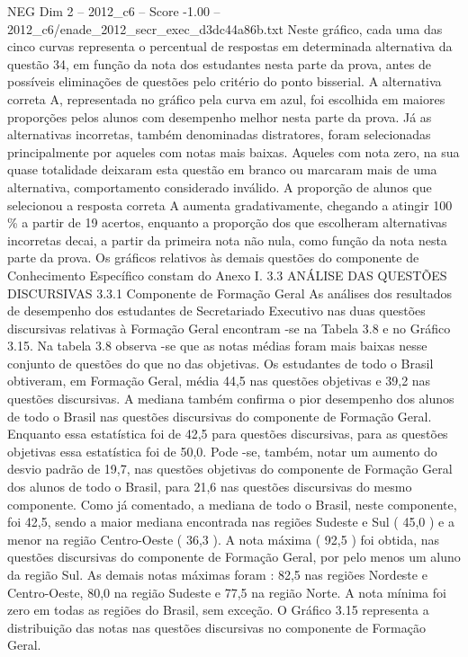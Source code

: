 \begin{textsample}{NEG Dim 2 – 2012\_c6 – Score -1.00 – 2012\_c6/enade\_2012\_secr\_exec\_d3dc44a86b.txt}
Neste gráfico, cada uma das cinco curvas representa o percentual de respostas em determinada alternativa da questão 34, em função da nota dos estudantes nesta parte da prova, antes de possíveis eliminações de questões pelo critério do ponto bisserial.
A alternativa correta A, representada no gráfico pela curva em azul, foi escolhida em maiores proporções pelos alunos com desempenho melhor nesta parte da prova.
Já as alternativas incorretas, também denominadas distratores, foram selecionadas principalmente por aqueles com notas mais baixas.
Aqueles com nota zero, na sua quase totalidade deixaram esta questão em branco ou marcaram mais de uma alternativa, comportamento considerado inválido.
A proporção de alunos que selecionou a resposta correta A aumenta gradativamente, chegando a atingir 100 \% a partir de 19 acertos, enquanto a proporção dos que escolheram alternativas incorretas decai, a partir da primeira nota não nula, como função da nota nesta parte da prova.
Os gráficos relativos às demais questões do componente de Conhecimento Específico constam do Anexo I. 3.3 ANÁLISE DAS QUESTÕES DISCURSIVAS 3.3.1 Componente de Formação Geral As análises dos resultados de desempenho dos estudantes de Secretariado Executivo nas duas questões discursivas relativas à Formação Geral encontram -se na Tabela 3.8 e no Gráfico 3.15.
Na tabela 3.8 observa -se que as notas médias foram mais baixas nesse conjunto de questões do que no das objetivas.
Os estudantes de todo o Brasil obtiveram, em Formação Geral, média 44,5 nas questões objetivas e 39,2 nas questões discursivas.
A mediana também confirma o pior desempenho dos alunos de todo o Brasil nas questões discursivas do componente de Formação Geral.
Enquanto essa estatística foi de 42,5 para questões discursivas, para as questões objetivas essa estatística foi de 50,0.
Pode -se, também, notar um aumento do desvio padrão de 19,7, nas questões objetivas do componente de Formação Geral dos alunos de todo o Brasil, para 21,6 nas questões discursivas do mesmo componente.
Como já comentado, a mediana de todo o Brasil, neste componente, foi 42,5, sendo a maior mediana encontrada nas regiões Sudeste e Sul ( 45,0 ) e a menor na região Centro-Oeste ( 36,3 ).
A nota máxima ( 92,5 ) foi obtida, nas questões discursivas do componente de Formação Geral, por pelo menos um aluno da região Sul.
As demais notas máximas foram : 82,5 nas regiões Nordeste e Centro-Oeste, 80,0 na região Sudeste e 77,5 na região Norte.
A nota mínima foi zero em todas as regiões do Brasil, sem exceção.
O Gráfico 3.15 representa a distribuição das notas nas questões discursivas no componente de Formação Geral.

\end{textsample}
